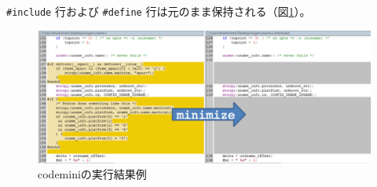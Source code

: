 \verb|#include| 行および \verb|#define| 行は元のまま保持される（図\ref{miniresult}）。
\begin{figure}[ht]
  \centering
  \includegraphics[width=\textwidth]{pic/miniresult.eps}
  \caption{\acrshort{codemini}の実行結果例}
  \label{miniresult}
\end{figure}
\par

